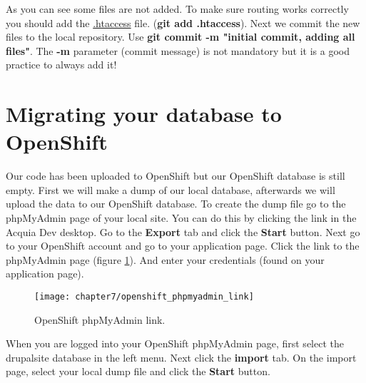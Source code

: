   As you can see some files are not added. To make sure routing works correctly you should add the \url{.htaccess} file. (\textbf{git add .htaccess}). Next we commit the new files to the local repository. Use \textbf{git commit -m "initial commit, adding all files"}. The \textbf{-m} parameter (commit message) is not mandatory but it is a good practice to always add it! 
  
  \section{Migrating your database to OpenShift}
  
  Our code has been uploaded to OpenShift but our OpenShift database is still empty. First we will make a dump of our local database, afterwards we will upload the data to our OpenShift database. To create the dump file go to the phpMyAdmin page of your local site. You can do this by clicking the link in the Acquia Dev desktop. Go to the \textbf{Export} tab and click the \textbf{Start} button. Next go to your OpenShift account and go to your application page. Click the link to the phpMyAdmin page (figure \ref{fig:openshift_phpmyadmin_link}). And enter your credentials (found on your application page).
  
    \begin{figure}[H]
    	\centering
    	\texttt{[image: chapter7/openshift\_phpmyadmin\_link]}
    	\caption{OpenShift phpMyAdmin link.}
    	\label{fig:openshift_phpmyadmin_link}
    \end{figure}
    
    When you are logged into your OpenShift phpMyAdmin page, first select the drupalsite database in the left menu. Next click the \textbf{import} tab. On the import page, select your local dump file and click the \textbf{Start} button.
    
    